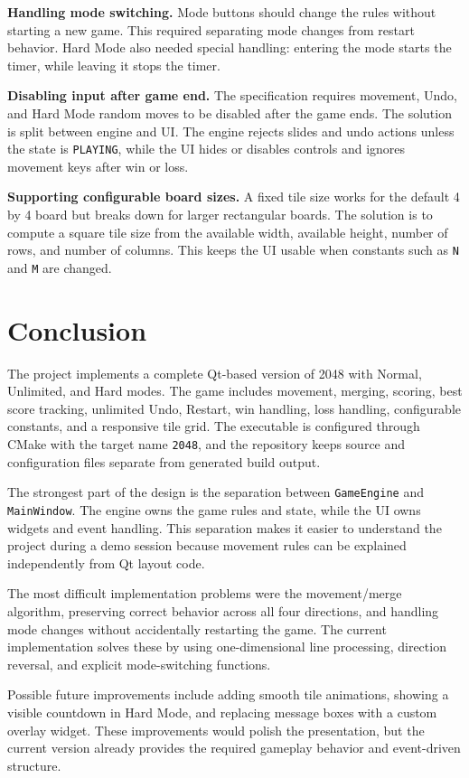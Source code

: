 \documentclass[a4paper,12pt]{article}
\begin{document}
\textbf{Handling mode switching.} Mode buttons should change the rules without starting a new game. This required separating mode changes from restart behavior. Hard Mode also needed special handling: entering the mode starts the timer, while leaving it stops the timer.

\textbf{Disabling input after game end.} The specification requires movement, Undo, and Hard Mode random moves to be disabled after the game ends. The solution is split between engine and UI. The engine rejects slides and undo actions unless the state is \texttt{PLAYING}, while the UI hides or disables controls and ignores movement keys after win or loss.

\textbf{Supporting configurable board sizes.} A fixed tile size works for the default 4 by 4 board but breaks down for larger rectangular boards. The solution is to compute a square tile size from the available width, available height, number of rows, and number of columns. This keeps the UI usable when constants such as \texttt{N} and \texttt{M} are changed.

\section{Conclusion}

The project implements a complete Qt-based version of 2048 with Normal, Unlimited, and Hard modes. The game includes movement, merging, scoring, best score tracking, unlimited Undo, Restart, win handling, loss handling, configurable constants, and a responsive tile grid. The executable is configured through CMake with the target name \texttt{2048}, and the repository keeps source and configuration files separate from generated build output.

The strongest part of the design is the separation between \texttt{GameEngine} and \texttt{MainWindow}. The engine owns the game rules and state, while the UI owns widgets and event handling. This separation makes it easier to understand the project during a demo session because movement rules can be explained independently from Qt layout code.

The most difficult implementation problems were the movement/merge algorithm, preserving correct behavior across all four directions, and handling mode changes without accidentally restarting the game. The current implementation solves these by using one-dimensional line processing, direction reversal, and explicit mode-switching functions.

Possible future improvements include adding smooth tile animations, showing a visible countdown in Hard Mode, and replacing message boxes with a custom overlay widget. These improvements would polish the presentation, but the current version already provides the required gameplay behavior and event-driven structure.
\end{document}
